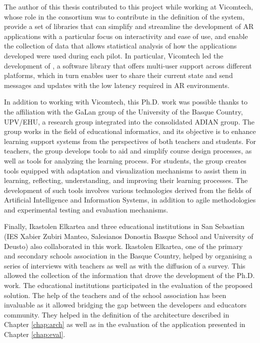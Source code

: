 The author of this thesis contributed to this project while working at Vicomtech, whose role in the consortium was to contribute in the definition of the system, provide a set of libraries that can simplify and streamline the development of AR applications with a particular focus on interactivity and ease of use, and enable the collection of data that allows statistical analysis of how the applications developed were used during each pilot. In particular, Vicomtech led the development of \ork{}, a software library that offers multi-user support across different platforms, which in turn enables user to share their current state and send messages and updates with the low latency required in AR environments.

In addition to working with Vicomtech, this Ph.D. work was possible thanks to the affiliation with the GaLan group of the University of the Basque Country, UPV/EHU, a research group integrated into the consolidated ADIAN group. The group works in the field of educational informatics, and its objective is to enhance learning support systems from the perspectives of both teachers and students. For teachers, the group develops tools to aid and simplify course design processes, as well as tools for analyzing the learning process. For students, the group creates tools equipped with adaptation and visualization mechanisms to assist them in learning, reflecting, understanding, and improving their learning processes. The development of such tools involves various technologies derived from the fields of Artificial Intelligence and Information Systems, in addition to agile methodologies and experimental testing and evaluation mechanisms.

Finally, Ikastolen Elkartea and three educational institutions in San Sebastian (IES Xabier Zubiri Manteo, Salesianos Donostia Basque School and University of Deusto) also collaborated in this work. Ikastolen Elkartea, one of the primary and secondary schools association in the Basque Country, helped by organising a series of interviews with teachers as well as with the diffusion of a survey. This allowed the collection of the information that drove the development of the Ph.D. work. The educational institutions participated in the evaluation of the proposed solution. The help of the teachers and of the school association has been invaluable as it allowed bridging the gap between the developers and educators community. They helped in the definition of the architecture described in Chapter \ref{chap:arch} as well as in the evaluation of the application presented in Chapter \ref{chap:eval}.


